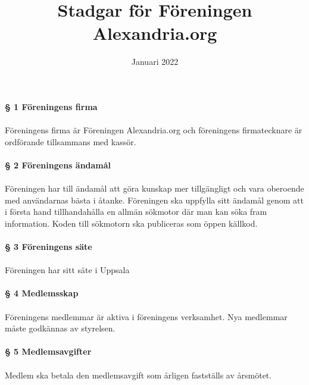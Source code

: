 \documentclass[12pt, a4paper]{article}
\title{Stadgar för Föreningen Alexandria.org}
\date{Januari 2022}
\begin{document}
\maketitle

\paragraph{§ 1 Föreningens firma}
\paragraph{}
Föreningens firma är Föreningen Alexandria.org och föreningens firmatecknare är ordförande tillsammans med kassör.

\paragraph{§ 2 Föreningens ändamål}
\paragraph{}
Föreningen har till ändamål att göra kunskap mer tillgängligt och vara oberoende med användarnas bästa i åtanke. Föreningen ska uppfylla
sitt ändamål genom att i första hand tillhandahålla en allmän sökmotor där man kan söka fram information. Koden till sökmotorn ska publiceras som öppen källkod.

\paragraph{§ 3 Föreningens säte}
\paragraph{}
Föreningen har sitt säte i Uppsala

\paragraph{§ 4 Medlemsskap}
\paragraph{}
Föreningens medlemmar är aktiva i föreningens verksamhet. Nya medlemmar måste godkännas av styrelsen.

\paragraph{§ 5 Medlemsavgifter}
\paragraph{}
Medlem ska betala den medlemsavgift som årligen fastställs av årsmötet.
\end{document}
